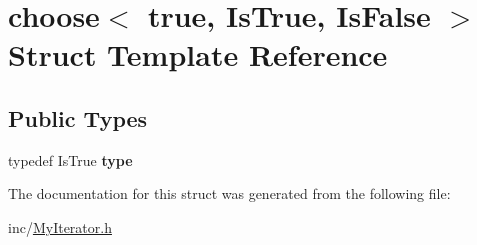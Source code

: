 \hypertarget{structchoose_3_01true_00_01IsTrue_00_01IsFalse_01_4}{}\section{choose$<$ true, Is\+True, Is\+False $>$ Struct Template Reference}
\label{structchoose_3_01true_00_01IsTrue_00_01IsFalse_01_4}
\subsection*{Public Types}
\begin{DoxyCompactItemize}
\item 
\mbox{\label{structchoose_3_01true_00_01IsTrue_00_01IsFalse_01_4_a27b97c90ea926773112efcb1d7825df3}} 
typedef Is\+True {\bfseries type}
\end{DoxyCompactItemize}


The documentation for this struct was generated from the following file\+:\begin{DoxyCompactItemize}
\item 
inc/\hyperlink{MyIterator_8h}{My\+Iterator.\+h}\end{DoxyCompactItemize}
